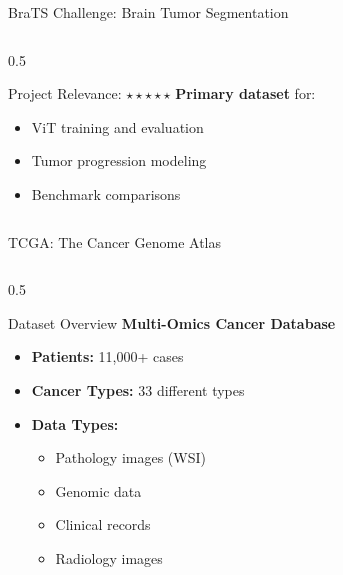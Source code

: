 \documentclass[aspectratio=169]{beamer}
\begin{document}
\begin{frame}{BraTS Challenge: Brain Tumor Segmentation}
\begin{columns}
\begin{column}{0.5\textwidth}
            \begin{alertblock}{Project Relevance: $\star\star\star\star\star$}
                \textbf{Primary dataset} for:
                \begin{itemize}
                    \item ViT training and evaluation
                    \item Tumor progression modeling
                    \item Benchmark comparisons
                \end{itemize}
            \end{alertblock}
        \end{column}
    \end{columns}
\end{frame}

\begin{frame}{TCGA: The Cancer Genome Atlas}
    \begin{columns}
        \begin{column}{0.5\textwidth}
            \begin{block}{Dataset Overview}
                \textbf{Multi-Omics Cancer Database}
                \begin{itemize}
                    \item \textbf{Patients:} 11,000+ cases
                    \item \textbf{Cancer Types:} 33 different types
                    \item \textbf{Data Types:}
                    \begin{itemize}
                        \item Pathology images (WSI)
                        \item Genomic data
                        \item Clinical records
                        \item Radiology images
                    \end{itemize}
                \end{itemize}
            \end{block}
            

\end{column}
\end{columns}
\end{frame}
\end{document}
